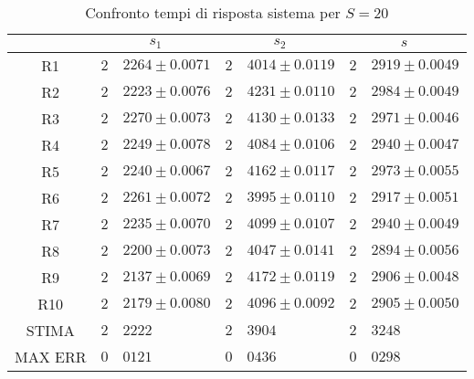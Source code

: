 \begin{table}[!h]
\begin{tabular}{c|r@{.}l|r@{.}l|r@{.}l}
& \multicolumn{2}{|c|}{$s_1$}
& \multicolumn{2}{|c|}{$s_2$}
& \multicolumn{2}{|c}{$s$} 
\\          
\hline
R1      & $2$&$2264 \pm 0.0071$ & $2$&$4014 \pm 0.0119$ & $2$&$2919 \pm 0.0049$ \\
R2      & $2$&$2223 \pm 0.0076$ & $2$&$4231 \pm 0.0110$ & $2$&$2984 \pm 0.0049$ \\
R3      & $2$&$2270 \pm 0.0073$ & $2$&$4130 \pm 0.0133$ & $2$&$2971 \pm 0.0046$ \\
R4      & $2$&$2249 \pm 0.0078$ & $2$&$4084 \pm 0.0106$ & $2$&$2940 \pm 0.0047$ \\
R5      & $2$&$2240 \pm 0.0067$ & $2$&$4162 \pm 0.0117$ & $2$&$2973 \pm 0.0055$ \\
R6      & $2$&$2261 \pm 0.0072$ & $2$&$3995 \pm 0.0110$ & $2$&$2917 \pm 0.0051$ \\
R7      & $2$&$2235 \pm 0.0070$ & $2$&$4099 \pm 0.0107$ & $2$&$2940 \pm 0.0049$ \\
R8      & $2$&$2200 \pm 0.0073$ & $2$&$4047 \pm 0.0141$ & $2$&$2894 \pm 0.0056$ \\
R9      & $2$&$2137 \pm 0.0069$ & $2$&$4172 \pm 0.0119$ & $2$&$2906 \pm 0.0048$ \\
R10     & $2$&$2179 \pm 0.0080$ & $2$&$4096 \pm 0.0092$ & $2$&$2905 \pm 0.0050$ \\
STIMA   & $2$&$2222$            & $2$&$3904$            & $2$&$3248$            \\
MAX ERR & $0$&$0121$            & $0$&$0436$            & $0$&$0298$            
\end{tabular}
\centering
\caption{Confronto tempi di risposta sistema per $S=20$}
\label{system_srv_20}
\end{table}


